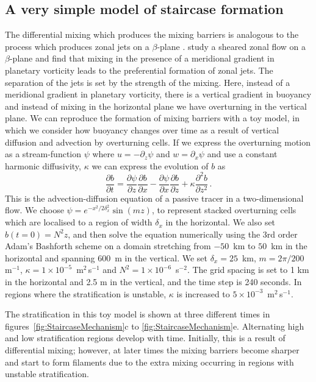\subsection{A very simple model of staircase formation}
The differential mixing which produces the mixing barriers is analogous to the process which produces zonal jets on a $\beta$-plane \citep{Manfroi1999}. \citet{Manfroi1999} study a sheared zonal flow on a $\beta$-plane and find that mixing in the presence of a meridional gradient in planetary vorticity leads to the preferential formation of zonal jets. The separation of the jets is set by the strength of the mixing. Here, instead of a meridional gradient in planetary vorticity, there is a vertical gradient in buoyancy and instead of mixing in the horizontal plane we have overturning in the vertical plane. We can reproduce the formation of mixing barriers with a toy model, in which we consider how buoyancy changes over time as a result of vertical diffusion and advection by overturning cells. If we express the overturning motion as a stream-function $\psi$ where $u = - \partial_z \psi$ and $w = \partial_x \psi$ and use a constant harmonic diffusivity, $\kappa$ we can express the evolution of $b$ as
\begin{equation}
    \frac{\partial b}{\partial t} = \frac{\partial \psi}{\partial z} \frac{\partial b}{\partial x} - \frac{\partial \psi}{\partial x} \frac{\partial b}{\partial z} + \kappa \frac{\partial^2 b}{\partial z^2} \, .
\end{equation}
This is the advection-diffusion equation of a passive tracer in a two-dimensional flow. We choose $\psi = e^{- x^2 / 2\delta_x^2} \sin(m z)$, to represent stacked overturning cells which are localised to a region of width $\delta_x$ in the horizontal. We also set $b(t=0) = N^2 z$, and then solve the equation numerically using the 3rd order Adam's Bashforth scheme on a domain stretching from $-50$~km to $50$~km in the horizontal and spanning $600$~m in the vertical. We set $\delta_x = 25$~km, $m = 2 \pi / 200$ m$^{-1}$, $\kappa = 1 \times 10^{-5}$~m$^2$\,s$^{-1}$ and $N^2 = 1 \times 10^{-6}$~s$^{-2}$. The grid spacing is set to 1 km in the horizontal and 2.5 m in the vertical, and the time step is 240 seconds. In regions where the stratification is unstable, $\kappa$ is increased to $5 \times 10^{-3}$~m$^2$\,s$^{-1}$.

The stratification in this toy model is shown at three different times in figures~\ref{fig:StaircaseMechanism}c to \ref{fig:StaircaseMechanism}e. Alternating high and low stratification regions develop with time. Initially, this is a result of differential mixing; however, at later times the mixing barriers become sharper and start to form filaments due to the extra mixing occurring in regions with unstable stratification.


